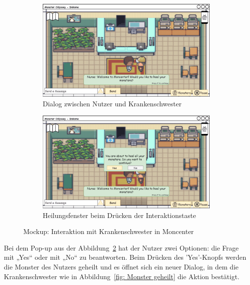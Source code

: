 \begin{figure}[H]
    \centering
    \begin{subfigure}[b]{0.4\textwidth}
        \includegraphics[width=\textwidth]{images/mockups/Heilung/PlayerInMoncenterHealingDialog.png}
        \caption{Dialog zwischen Nutzer und Krankenschwester}
        \label{fig: Dialog zwischen Nutzer und Krankenschwester}
    \end{subfigure}
    \hfill
    \begin{subfigure}[b]{0.4\textwidth}
        \includegraphics[width=\textwidth]{images/mockups/Heilung/PlayerInMoncenterHealingPopUp.png}
        \caption{Heilungsfenster beim Drücken der Interaktionstaste}
        \label{fig: Heilungsfenster}
    \end{subfigure}
    \caption{Mockup: Interaktion mit Krankenschwester in Moncenter}
    \label{fig: Interaktion mit Krankenschwester in Moncenter}
\end{figure}
Bei dem Pop-up aus der Abbildung~\ref{fig: Heilungsfenster} hat der Nutzer zwei Optionen: die Frage mit „Yes“ oder mit „No“ zu beantworten. Beim Drücken des 'Yes'-Knopfs werden die Monster des Nutzers geheilt und es öffnet sich ein neuer Dialog, in dem die Krankenschwester wie in Abbildung~\ref{fig: Monster geheilt} die Aktion bestätigt. 
